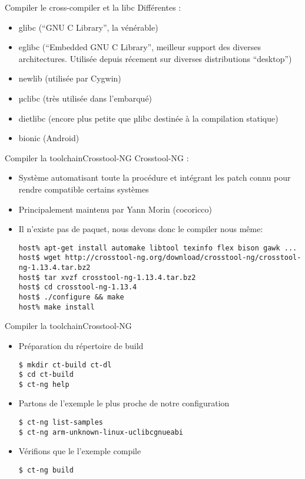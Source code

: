 \begin{frame}[fragile=singleslide]{Compiler le cross-compiler et la libc}
  Différentes :
  \begin{itemize}
  \item glibc (``GNU C Library'', la vénérable)
  \item  eglibc  (``Embedded GNU  C  Library'',  meilleur support  des
    diverses  architectures.  Utilisée  depuis récement  sur  diverses
    distributions ``desktop'')
  \item newlib (utilisée par Cygwin) 
  \item µclibc (très utilisée dans l'embarqué)
  \item  dietlibc  (encore  plus   petite  que  µlibc  destinée  à  la
    compilation statique)
  \item bionic (Android)
  \end{itemize}
\end{frame}

\begin{frame}[fragile=singleslide]{Compiler la toolchain}{Crosstool-NG}
  Crosstool-NG :
  \begin{itemize}
  \item Système automatisant toute la procédure et intégrant les patch
    connu pour rendre compatible certains systèmes
  \item Principalement maintenu par Yann Morin (cocoricco)
  \item Il n'existe  pas de paquet, nous devons  donc le compiler nous
    même:
    \begin{lstlisting}
host% apt-get install automake libtool texinfo flex bison gawk ...
host$ wget http://crosstool-ng.org/download/crosstool-ng/crosstool-ng-1.13.4.tar.bz2
host$ tar xvzf crosstool-ng-1.13.4.tar.bz2
host$ cd crosstool-ng-1.13.4
host$ ./configure && make
host% make install
    \end{lstlisting}
  \end{itemize}
\end{frame}
   
\begin{frame}[fragile=singleslide]{Compiler la toolchain}{Crosstool-NG}
  \begin{itemize}
  \item Préparation du répertoire de build
    \begin{lstlisting}
$ mkdir ct-build ct-dl
$ cd ct-build
$ ct-ng help
    \end{lstlisting}
  \item Partons de l'exemple le plus proche de notre configuration
    \begin{lstlisting}
$ ct-ng list-samples
$ ct-ng arm-unknown-linux-uclibcgnueabi
    \end{lstlisting}
  \item Vérifions que le l'exemple compile
    \begin{lstlisting}
$ ct-ng build
    \end{lstlisting}
  \end{itemize}
\end{frame}

